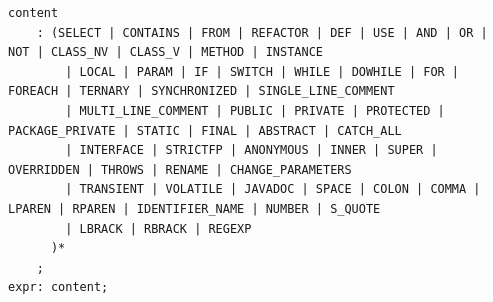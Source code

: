 \documentclass[12pt, letterpaper]{article}
\begin{document}
\begin{lstlisting}
content
    : (SELECT | CONTAINS | FROM | REFACTOR | DEF | USE | AND | OR | NOT | CLASS_NV | CLASS_V | METHOD | INSTANCE
        | LOCAL | PARAM | IF | SWITCH | WHILE | DOWHILE | FOR | FOREACH | TERNARY | SYNCHRONIZED | SINGLE_LINE_COMMENT
        | MULTI_LINE_COMMENT | PUBLIC | PRIVATE | PROTECTED | PACKAGE_PRIVATE | STATIC | FINAL | ABSTRACT | CATCH_ALL
        | INTERFACE | STRICTFP | ANONYMOUS | INNER | SUPER | OVERRIDDEN | THROWS | RENAME | CHANGE_PARAMETERS
        | TRANSIENT | VOLATILE | JAVADOC | SPACE | COLON | COMMA | LPAREN | RPAREN | IDENTIFIER_NAME | NUMBER | S_QUOTE
        | LBRACK | RBRACK | REGEXP
      )*
    ;
expr: content;
\end{lstlisting}
\end{document}
